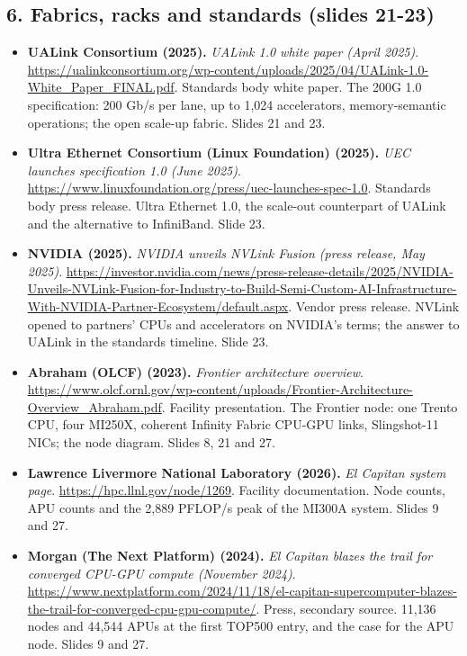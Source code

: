 \documentclass[11pt,letterpaper]{article}
\begin{document}
\subsection*{6. Fabrics, racks and standards (slides 21-23)}
\begin{itemize}[leftmargin=1.2em,itemsep=3pt]\sloppy
\item \textbf{UALink Consortium (2025).} \textit{UALink 1.0 white paper (April 2025)}. \url{https://ualinkconsortium.org/wp-content/uploads/2025/04/UALink-1.0-White_Paper_FINAL.pdf}. Standards body white paper. The 200G 1.0 specification: 200 Gb/s per lane, up to 1,024 accelerators, memory-semantic operations; the open scale-up fabric. Slides 21 and 23.
\item \textbf{Ultra Ethernet Consortium (Linux Foundation) (2025).} \textit{UEC launches specification 1.0 (June 2025)}. \url{https://www.linuxfoundation.org/press/uec-launches-spec-1.0}. Standards body press release. Ultra Ethernet 1.0, the scale-out counterpart of UALink and the alternative to InfiniBand. Slide 23.
\item \textbf{NVIDIA (2025).} \textit{NVIDIA unveils NVLink Fusion (press release, May 2025)}. \url{https://investor.nvidia.com/news/press-release-details/2025/NVIDIA-Unveils-NVLink-Fusion-for-Industry-to-Build-Semi-Custom-AI-Infrastructure-With-NVIDIA-Partner-Ecosystem/default.aspx}. Vendor press release. NVLink opened to partners' CPUs and accelerators on NVIDIA's terms; the answer to UALink in the standards timeline. Slide 23.
\item \textbf{Abraham (OLCF) (2023).} \textit{Frontier architecture overview}. \url{https://www.olcf.ornl.gov/wp-content/uploads/Frontier-Architecture-Overview_Abraham.pdf}. Facility presentation. The Frontier node: one Trento CPU, four MI250X, coherent Infinity Fabric CPU-GPU links, Slingshot-11 NICs; the node diagram. Slides 8, 21 and 27.
\item \textbf{Lawrence Livermore National Laboratory (2026).} \textit{El Capitan system page}. \url{https://hpc.llnl.gov/node/1269}. Facility documentation. Node counts, APU counts and the 2,889 PFLOP/s peak of the MI300A system. Slides 9 and 27.
\item \textbf{Morgan (The Next Platform) (2024).} \textit{El Capitan blazes the trail for converged CPU-GPU compute (November 2024)}. \url{https://www.nextplatform.com/2024/11/18/el-capitan-supercomputer-blazes-the-trail-for-converged-cpu-gpu-compute/}. Press, secondary source. 11,136 nodes and 44,544 APUs at the first TOP500 entry, and the case for the APU node. Slides 9 and 27.
\end{itemize}
\end{document}
